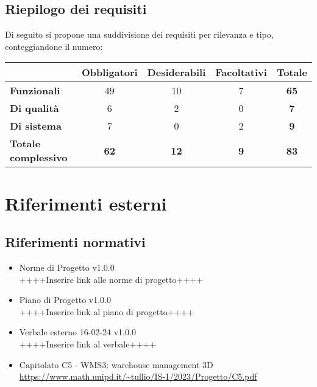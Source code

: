 \subsection{Riepilogo dei requisiti}\label{subsec:riepilogo}
Di seguito si propone una suddivisione dei requisiti per rilevanza e tipo, conteggiandone il numero:

\begin{table}[h]
    \centering
    \renewcommand\tabularxcolumn[1]{m{#1}} %
    \renewcommand{\arraystretch}{1.5}
    \begin{tabular}{|l|c|c|c||c|}
        \hline
        \rowcolor{black}
        \multicolumn{1}{|c|}{\cellcolor{white}Tipo\textbackslash Priorità} & \textbf{\color{white}Obbligatori} & \textbf{\color{white}Desiderabili} & \textbf{\color{white}Facoltativi} & \textbf{\color{white}Totale}\\ 
        \hline

        \cellcolor{black} \textbf{\color{white}Funzionali} & 49 & 10 & 7 & \textbf{65}\\
        \cellcolor{black} \textbf{\color{white}Di qualità} & 6 & 2 & 0 & \textbf{7}\\
        \cellcolor{black} \textbf{\color{white}Di sistema} & 7 & 0 & 2 & \textbf{9}\\

        \hline\hline
        \cellcolor{black} \textbf{\color{white}Totale complessivo} & \textbf{62} & \textbf{12} & \textbf{9} & \textbf{83}\\
        \hline
    \end{tabular}
\end{table}


\newpage
\section{Riferimenti esterni}\label{sec:riferimenti}

\subsection{Riferimenti normativi}\label{sec:riferimenti_normativi}
\begin{itemize}
    \item Norme di Progetto v1.0.0 \\
    ++++Inserire link alle norme di progetto++++
    \item Piano di Progetto v1.0.0 \\
    ++++Inserire link al piano di progetto++++
    \item Verbale esterno 16-02-24 v1.0.0 \\
    ++++Inserire link al verbale++++
    \item Capitolato C5 - WMS3: warehouse management 3D \\
    \url{https://www.math.unipd.it/~tullio/IS-1/2023/Progetto/C5.pdf}
\end{itemize}

